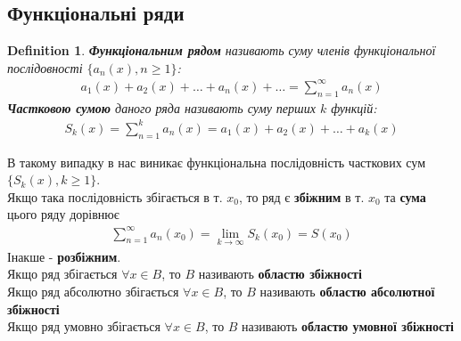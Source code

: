 \documentclass[a4paper, 10pt]{article}
\def\huge{\displaystyle}
\theoremstyle{theoremdd}
\theoremstyle{theoremdd}
\theoremstyle{theoremdd}
\newtheorem{definition}[theorem]{Definition}
\theoremstyle{theoremdd}
\theoremstyle{theoremdd}
\theoremstyle{theoremdd}
\theoremstyle{theoremdd}
\theoremstyle{theoremdd}
\theoremstyle{theoremdd}
\begin{document}
\subsection{Функціональні ряди}
\begin{definition}
\textbf{Функціональним рядом} називають суму членів функціональної послідовності $\{a_n(x), n \geq 1\}$:
\begin{align*}
a_1(x) + a_2(x) + \dots + a_n(x) + \dots = \huge \sum_{n=1}^\infty a_n(x)
\end{align*}
\textbf{Частковою сумою} даного ряда називають суму перших $k$ функцій:
\begin{align*}
S_k(x) = \sum_{n=1}^k a_n(x) = a_1(x) + a_2(x) + \dots + a_k(x)
\end{align*}
\end{definition}

В такому випадку в нас виникає функціональна послідовність часткових сум $\{S_k(x), k \geq 1\}$.\\
Якщо така послідовність збігається в т. $x_0$, то ряд є \textbf{збіжним} в т. $x_0$ та \textbf{сума} цього ряду дорівнює
\begin{align*}
\sum_{n=1}^\infty a_n(x_0) = \lim_{k \to \infty} S_k(x_0) = S(x_0)
\end{align*}
Інакше - \textbf{розбіжним}.\\
Якщо ряд збігається $\forall x \in B$, то $B$ називають \textbf{областю збіжності}
\bigskip \\
Якщо ряд абсолютно збігається $\forall x \in B$, то $B$ називають \textbf{областю абсолютної збіжності}
\bigskip \\
Якщо ряд умовно збігається $\forall x \in B$, то $B$ називають \textbf{областю умовної збіжності}
\end{document}
